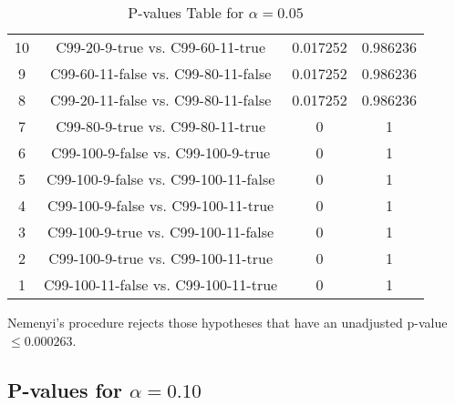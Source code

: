 \documentclass[a4paper,10pt]{article}
\begin{document}
\begin{landscape}
\begin{table}[!htp]
\begin{tabular}{cccc}
10&C99-20-9-true vs. C99-60-11-true&0.017252&0.986236\\
9&C99-60-11-false vs. C99-80-11-false&0.017252&0.986236\\
8&C99-20-11-false vs. C99-80-11-false&0.017252&0.986236\\
7&C99-80-9-true vs. C99-80-11-true&0&1\\
6&C99-100-9-false vs. C99-100-9-true&0&1\\
5&C99-100-9-false vs. C99-100-11-false&0&1\\
4&C99-100-9-false vs. C99-100-11-true&0&1\\
3&C99-100-9-true vs. C99-100-11-false&0&1\\
2&C99-100-9-true vs. C99-100-11-true&0&1\\
1&C99-100-11-false vs. C99-100-11-true&0&1\\
\hline
\end{tabular}
\caption{P-values Table for $\alpha=0.05$}
\end{table}Nemenyi's procedure rejects those hypotheses that have an unadjusted p-value $\le0.000263$.

\pagebreak

\subsection{P-values for $\alpha=0.10$}


\end{landscape}
\end{document}
